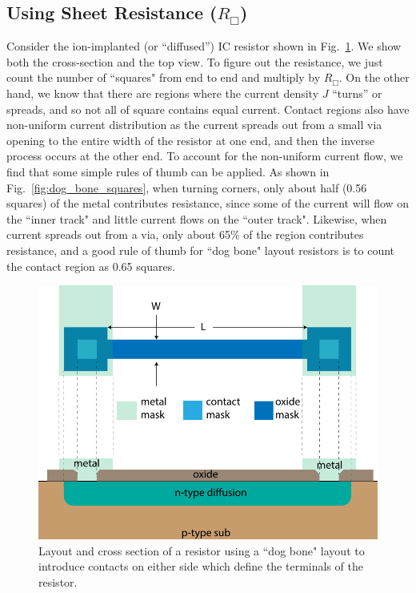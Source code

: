\subsection{Using Sheet Resistance (\texorpdfstring{$R_\Box$}{})}
Consider the ion-implanted (or “diffused”) IC resistor shown in Fig.~\ref{fig:diff_resistor_top}.  We show both the cross-section and the top view.  To figure out the resistance, we just count the number of ``squares" from end to end and multiply by $R_\Box$.  On the other hand, we know that there are regions where the current density $J$ ``turns” or spreads, and so not all of square contains equal current.   Contact regions also have non-uniform current distribution as the current spreads out from a small via opening to the entire width of the resistor at one end, and then the inverse process occurs at the other end.  To account for the non-uniform current flow, we find that some simple rules of thumb can be applied.  As shown in Fig.~\ref{fig:dog_bone_squares}, when turning corners, only about half (0.56 squares) of the metal contributes resistance, since some of the current will flow on the ``inner track" and little current flows on the ``outer track".  Likewise, when current spreads out from a via, only about 65\% of the region contributes resistance, and a good rule of thumb for ``dog bone" layout resistors is to count the contact region as 0.65 squares.
\begin{figure}[tb]
\centering
\includegraphics[width=.7\columnwidth]{diff_resistor_top}
\caption{Layout and cross section of a resistor using a ``dog bone" layout to introduce contacts on either side which define the terminals of the resistor.}
\label{fig:diff_resistor_top}
\end{figure}
